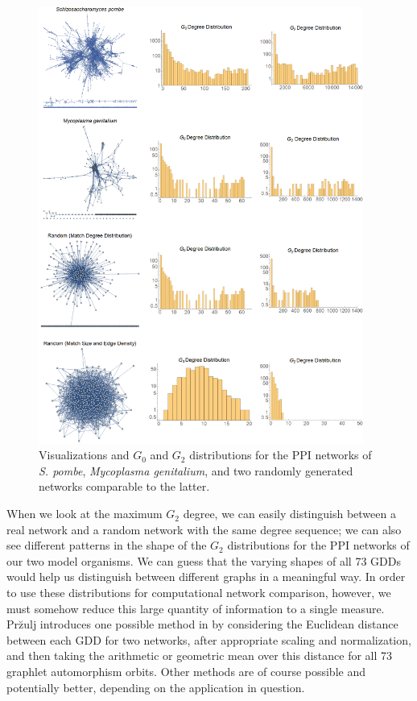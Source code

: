 \documentclass[12pt]{thesis}
\theoremstyle{plain}
\theoremstyle{definition}
\theoremstyle{remark}
\begin{document}
\begin{figure}[!ph]
\centering
\includegraphics[width=0.95\textwidth]{graphlet_degree_distributions.png}
\caption{Visualizations and $G_0$ and $G_2$ distributions for the PPI networks of \textit{S. pombe}, \textit{Mycoplasma genitalium}, and two randomly generated networks comparable to the latter.}
\label{fig:GDD_demo}
\end{figure}

When we look at the maximum $G_2$ degree, we can easily distinguish between a real network and a random network with the same degree sequence; we can also see different patterns in the shape of the $G_2$ distributions for the PPI networks of our two model organisms. We can guess that the varying shapes of all 73 GDDs would help us distinguish between different graphs in a meaningful way. In order to use these distributions for computational network comparison, however, we must somehow reduce this large quantity of information to a single measure. Pr\u{z}ulj introduces one possible method in \cite{Przulj_2007} by considering the Euclidean distance between each GDD for two networks, after appropriate scaling and normalization, and then taking the arithmetic or geometric mean over this distance for all 73 graphlet automorphism orbits. Other methods are of course possible and potentially better, depending on the application in question.
\end{document}
